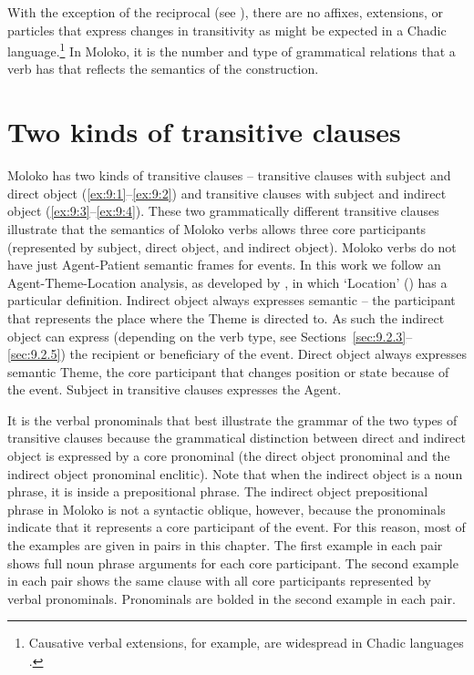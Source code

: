 \largerpage With the exception of the reciprocal (see ), there are no affixes, extensions, or particles that express changes in transitivity as might be expected in a Chadic language.\footnote{Causative verbal extensions, for example, are widespread in Chadic languages \citep[276]{Newman1977}.} In Moloko, it is the number and type of grammatical relations that a verb has that reflects the semantics of the construction.

\section{Two kinds of transitive clauses}\label{sec:9.1}
\hypertarget{RefHeading1212641525720847}{}
Moloko has two kinds of transitive clauses -- transitive clauses with subject and direct object (\ref{ex:9:1}--\ref{ex:9:2}) and transitive clauses with subject and indirect object (\ref{ex:9:3}--\ref{ex:9:4}). These two grammatically different transitive clauses illustrate that the semantics of Moloko verbs allows three core participants (represented by subject, direct object, and indirect object). Moloko verbs do not have just Agent-Patient semantic frames for events. In this work we follow an Agent-Theme-Location analysis, as developed by \citet{DeLancey1991}, in which ‘Location’ (\LOC) has a particular definition. Indirect object always expresses semantic {\LOC} -- the participant that represents the place where the Theme is directed to. As such the indirect object can express (depending on the verb type, see Sections~\ref{sec:9.2.3}--\ref{sec:9.2.5}) the recipient or beneficiary of the event. Direct object always expresses semantic Theme, the core participant that changes position or state because of the event. Subject in transitive clauses expresses the Agent.

It is the verbal pronominals that best illustrate the grammar of the two types of transitive clauses because the grammatical distinction between direct and indirect object is expressed by a core pronominal (the direct object pronominal and the indirect object pronominal enclitic). Note that when the indirect object is a noun phrase, it is inside a prepositional phrase. The indirect object prepositional phrase in Moloko is not a syntactic oblique, however, because the pronominals indicate that it represents a core participant of the event. For this reason, most of the examples are given in pairs in this chapter. The first example in each pair shows full noun phrase arguments for each core participant. The second example in each pair shows the same clause with all core participants represented by verbal pronominals. Pronominals are bolded in the second example in each pair. 

